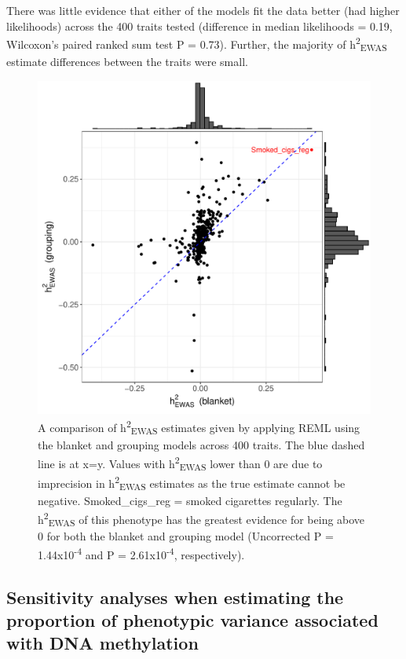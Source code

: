 \documentclass[11pt,oneside]{bristolthesis}
\begin{document}
There was little evidence that either of the models fit the data better (had higher likelihoods) across the 400 traits tested (difference in median likelihoods = 0.19, Wilcoxon's paired ranked sum test P = 0.73). Further, the majority of h\textsuperscript{2}\textsubscript{EWAS} estimate differences between the traits were small.


\begin{figure}

{\centering \includegraphics[width=1\linewidth]{figure/05-h2ewas/model_m2_comparison} 

}

\caption{A comparison of h\textsuperscript{2}\textsubscript{EWAS} estimates given by applying REML using the blanket and grouping models across 400 traits. The blue dashed line is at x=y. Values with h\textsuperscript{2}\textsubscript{EWAS} lower than 0 are due to imprecision in h\textsuperscript{2}\textsubscript{EWAS} estimates as the true estimate cannot be negative. Smoked\_cigs\_reg = smoked cigarettes regularly. The h\textsuperscript{2}\textsubscript{EWAS} of this phenotype has the greatest evidence for being above 0 for both the blanket and grouping model (Uncorrected P = 1.44x10\textsuperscript{-4} and P = 2.61x10\textsuperscript{-4}, respectively).}\label{fig:h2ewas-estimates}
\end{figure}
\hypertarget{results-sensitivity-analyses-05}{%
\subsection{Sensitivity analyses when estimating the proportion of phenotypic variance associated with DNA methylation}\label{results-sensitivity-analyses-05}}
\end{document}
